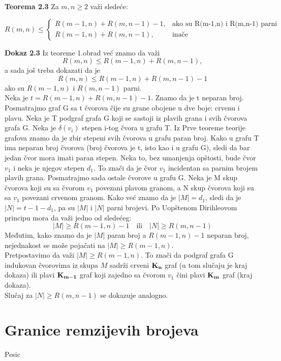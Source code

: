 \documentclass[12pt,a4paper]{article}
\begin{document}
	\newpage
	
	{\noindent\fontsize{12pt}{12pt}\textbf{Teorema 2.3}}
	Za $m,n\geq 2$  važi sledeće:
	
	\[
   	 R(m,n)\leq 
		\begin{cases}
    		R(m-1,n)+R(m,n-1)-1,& \text{ako su R(m-1,n) i R(m,n-1) parni}\\
    	R(m-1,n)+R(m,n-1),      & \text{inače}
	\end{cases}
	\]
	
	{\noindent\fontsize{12pt}{12pt}\textbf{Dokaz 2.3}}
	Iz teoreme 1.obrad već znamo da važi
	\[R(m,n)\leq R(m-1,n)+R(m,n-1),\]
	a sada još treba dokazati da je
	\[R(m,n)\leq R(m-1,n)+R(m,n-1)-1\] 
	ako su $R(m-1,n)$ i $R(m,n-1)$ parni.
	\vspace{0.5em}
	\\
	\noindent Neka je $t=R(m-1,n)+R(m,n-1)-1$.
	Znamo da je t neparan broj. Posmatrajmo graf G sa t čvorova čije su grane obojene u dve boje: crvenu i plavu. Neka je T podgraf grafa G koji se sastoji iz plavih grana i svih čvorova grafa G. Neka je $\delta(v_i)$ stepen i-tog čvora u grafu T. Iz Prve teoreme teorije grafova znamo da je zbir stepeni svih čvorova u grafu paran broj. Kako u grafu T ima neparan broj čvorova (broj čvorova je t, isto kao i u grafu G), sledi da bar jedan čvor mora imati paran stepen. Neka to, bez umanjenja opštosti, bude čvor $v_1$ i neka je njegov stepen $d_1$. To znači da je čvor $v_1$ incidentan sa parnim brojem plavih grana. Posmatrajmo sada ostale čvorove u grafu G. Neka je M skup čvorova koji su sa čvorom $v_1$ povezani plavom granom, a N skup čvorova koji su sa $v_1$ povezani crvenom granom. Kako već znamo da je $|M| = d_1$,  sledi da je $|N| = t-1-d_1$, pa su $|M|$ i $|N|$ parni brojevi. Po Uopštenom Dirihleovom principu mora da važi jedno od sledećeg:
	\[|M|\geq R(m-1,n)-1 \quad \text{ili} \quad  |N|\geq R(m,n-1)\] 
	Međutim, kako znamo da je $|M|$ paran broj a $R(m-1,n)-1$ neparan broj, nejednakost se može pojačati na $|M|\geq R(m-1,n)$. \\
	Pretpostavimo da važi $|M|\geq R(m-1,n)$. To znači da podgraf grafa G indukovan čvorovima iz skupa $M$ sadrži crveni $\bf K_n$ graf (u tom slučaju je kraj dokaza) ili plavi $\bf K_{m-1}$ graf koji zajedno sa čvorom $v_1$ čini plavi $\bf K_{m}$ graf (kraj dokaza).\\
	Slučaj za $|N|\geq R(m,n-1)$ se dokazuje analogno.
	
	\section{Granice remzijevih brojeva}
	Pesic
\end{document}
